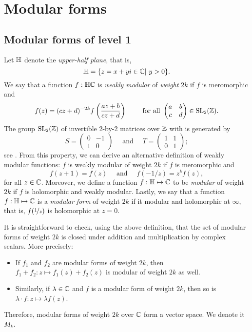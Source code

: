 \section{Modular forms}
\subsection{Modular forms of level 1}
Let $\mathbb{H}$ denote the \textit{upper-half plane}, that is, 
$$\mathbb{H} = \{z = x+yi \in \mathbb{C} | \ y>0 \}.$$
We say that a function $f:\mathbb{H} 
 \mathbb{C}$ is \textit{weakly modular} of \textit{weight} $2k$ if $f$ is meromorphic and
$$
f(z) = (cz+d)^{-2k} f \left( \frac{az+b}{cz+d} \right)
\qquad \text{ for all }
\begin{pmatrix} a & b\\
				c & d
\end{pmatrix}
\in \text{SL}_{2}(\mathbb{Z}).
$$
The group $\text{SL}_{2}(\mathbb{Z})$ of invertible 2-by-2 matrices over $\mathbb{Z}$ with  is generated by
$$
S = \begin{pmatrix} 0 & -1 \\
					1 &  0
\end{pmatrix}
\quad \text{ and } \quad
T = \begin{pmatrix} 1 & 1 \\
					0 & 1 
\end{pmatrix};
$$
see \cite[p.1-2]{SL2Z}.
From this property, we can derive an alternative definition of weakly modular functions:
$f$ is weakly modular of weight $2k$ if $f$ is meromorphic and
$$
f(z+1) = f(z) \quad \text{ and } \quad f(-1/z) = z^k f(z),
$$
for all $z \in \mathbb{C}$.
Moreover, we define a function $f:\mathbb{H} \mapsto \mathbb{C}$ to be \textit{modular} of weight $2k$ if $f$ is holomorphic and weakly modular.
Lastly, we say that a function $f:\mathbb{H} \mapsto \mathbb{C}$ is a \textit{modular form} of weight $2k$ if it modular and holomorphic at $\infty$, that is, $f(\nicefrac{1}{z})$ is holomorphic at $z=0$.

It is straightforward to check, using the above definition, that the set of modular forms of weight $2k$ is closed under addition and multiplication by complex scalars.
More precisely:
\begin{itemize}
    \item If $f_1$ and $f_2$ are modular forms of weight $2k$, then $f_1+f_2: z \mapsto f_1(z)+f_2(z)$ is modular of weight $2k$ as well.
    
    \item Similarly, if $\lambda \in \mathbb{C}$ and $f$ is a modular form of weight $2k$, then so is $\lambda \cdot f: z \mapsto \lambda f(z)$.
\end{itemize}
Therefore, modular forms of weight $2k$ over $\mathbb{C}$ form a vector space. We denote it $M_k$.

